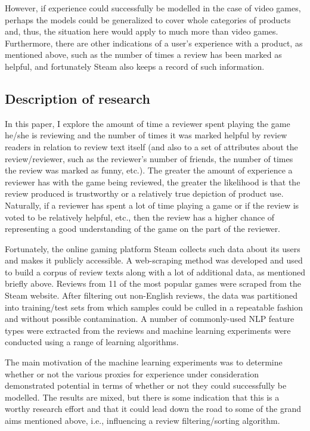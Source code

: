 \documentclass[9pt]{article}
\begin{document}
However, if experience could successfully be modelled in the case of video games, perhaps the models could be generalized to cover whole categories of products and, thus, the situation here would apply to much more than video games. Furthermore, there are other indications of a user's experience with a product, as mentioned above, such as the number of times a review has been marked as helpful, and fortunately Steam also keeps a record of such information.

\subsection{Description of research}
\label{ssec:description}

In this paper, I explore the amount of time a reviewer spent playing the game he/she is reviewing and the number of times it was marked helpful by review readers in relation to review text itself (and also to a set of attributes about the review/reviewer, such as the reviewer's number of friends, the number of times the review was marked as funny, etc.). The greater the amount of experience a reviewer has with the game being reviewed, the greater the likelihood is that the review produced is trustworthy or a relatively true depiction of product use. Naturally, if a reviewer has spent a lot of time playing a game or if the review is voted to be relatively helpful, etc., then the review has a higher chance of representing a good understanding of the game on the part of the reviewer.

Fortunately, the online gaming platform Steam collects such data about its users and makes it publicly accessible. A web-scraping method was developed and used to build a corpus of review texts along with a lot of additional data, as mentioned briefly above. Reviews from 11 of the most popular games were scraped from the Steam website. After filtering out non-English reviews, the data was partitioned into training/test sets from which samples could be culled in a repeatable fashion and without possible contamination. A number of commonly-used NLP feature types were extracted from the reviews and machine learning experiments were conducted using a range of learning algorithms.

The main motivation of the machine learning experiments was to determine whether or not the various proxies for experience under consideration demonstrated potential in terms of whether or not they could successfully be modelled. The results are mixed, but there is some indication that this is a worthy research effort and that it could lead down the road to some of the grand aims mentioned above, i.e., influencing a review filtering/sorting algorithm.
\end{document}
